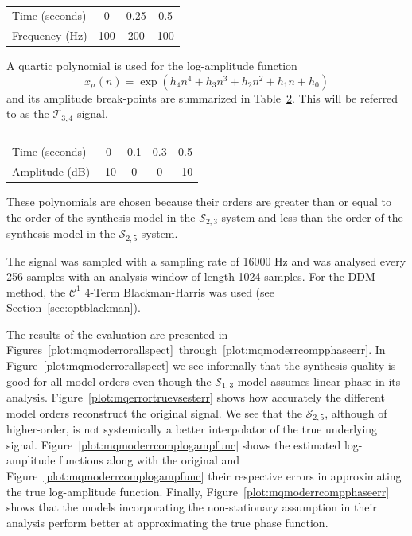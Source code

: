 \begin{table}[!b]
    \caption{\label{tab:cubicsinphparams}}
    \begin{center}
        \begin{tabular}{l|c c c}
            Time (seconds) & 0 & 0.25 & 0.5 \\
            Frequency (Hz) & 100 & 200 & 100
        \end{tabular}
    \end{center}
\end{table}

A quartic polynomial is used for the log-amplitude function
\[
    x_{\mu}(n) = \exp \left(h_4 n^{4} + h_3 n^{3} + h_2 n^{2} + h_1 n + h_0 \right)
\]
and its amplitude break-points are summarized in
Table~\ref{tab:quarticsinampparams}. This will be referred to as the
$\mathscr{T}_{3,4}$ signal.

\begin{table}[!b]
    \caption{\label{tab:quarticsinampparams}}
    \begin{center}
        \begin{tabular}{l|c c c c}
            Time (seconds) & 0 & 0.1 & 0.3 & 0.5 \\
            Amplitude (dB) & -10 & 0 & 0 & -10
        \end{tabular}
    \end{center}
\end{table}

These polynomials are chosen because their orders are greater than or equal to
the order of the synthesis model in the $\mathscr{S}_{2,3}$ system and less than
the order of the synthesis model in the $\mathscr{S}_{2,5}$ system.

The signal was sampled with a sampling rate of 16000 Hz and was analysed every
256 samples with an analysis window of length 1024 samples. For the DDM method, the
$\mathcal{C}^{1}$ 4-Term Blackman-Harris was used (see
Section~\ref{sec:optblackman}).

The results of the evaluation are presented in
Figures~\ref{plot:mqmoderrorallspect}~through~\ref{plot:mqmoderrcompphaseerr}.
In Figure~\ref{plot:mqmoderrorallspect} we see informally that the synthesis
quality is good for all model orders even though the $\mathscr{S}_{1,3}$ model
assumes linear phase in its analysis. Figure~\ref{plot:mqerrortruevsesterr}
shows how accurately the different model orders reconstruct the original signal.
We see that the $\mathscr{S}_{2,5}$, although of higher-order, is not systemically a
better interpolator of the true underlying signal.
Figure~\ref{plot:mqmoderrcomplogampfunc} shows the estimated log-amplitude functions
along with the original and Figure~\ref{plot:mqmoderrcomplogampfunc} their
respective errors in approximating the true log-amplitude function.  Finally,
Figure~\ref{plot:mqmoderrcompphaseerr} shows that the models incorporating the
non-stationary assumption in their analysis perform better at approximating the
true phase function. 

